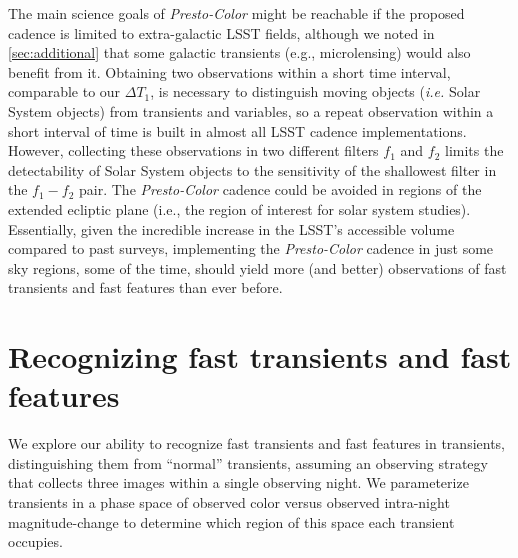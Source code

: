 \documentclass[letterpaper,longauthor,trackchanges,twocolumn,onecolappendix,sort&compress]{aastex62}
\newcommand{\dtone}{\ensuremath{\Delta T_1}}
\begin{document}
The main science goals of {\em Presto-Color} might be reachable if the proposed cadence is limited to extra-galactic LSST fields, although we noted in \autoref{sec:additional} that some galactic transients (e.g., microlensing) would also benefit from it. Obtaining two observations within a short time interval, comparable to our \dtone, is necessary to distinguish moving objects (\emph{i.e.} Solar System objects) from transients and variables, so a repeat observation within a short interval of time is built in almost all LSST cadence implementations. However, collecting these observations in two different filters $f_1$ and $f_2$  limits the detectability of Solar System objects to the sensitivity of the shallowest filter in the $f_1-f_2$ pair. The {\em Presto-Color} cadence could be avoided in regions of the extended ecliptic plane (i.e., the region of interest for solar system studies). Essentially, given the incredible increase in the LSST's accessible volume compared to past surveys, implementing the {\em Presto-Color} cadence in just some sky regions, some of the time, should yield more (and better) observations of fast transients and fast features than ever before.



\section{Recognizing fast transients and fast features}

We explore our ability to recognize fast transients and fast features in transients, distinguishing them from ``normal'' transients, assuming an observing strategy that collects three images within a single observing night. We parameterize transients in a phase space of observed color versus observed intra-night magnitude-change to determine which region of this space each transient occupies. 


\end{document}
